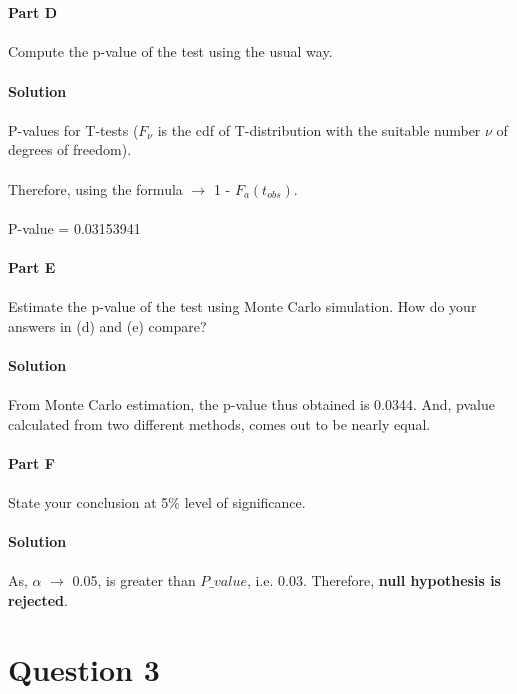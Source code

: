 \documentclass[12pt,a4paper]{report}
\begin{document}
\\\\
\textbf{Part D}
\\\\
Compute the p-value of the test using the usual way.
\\\\
\textbf{Solution}
\\\\
P-values for T-tests ($F_\nu$ is the cdf of T-distribution with the suitable number $\nu$ of degrees of freedom).\\\\
Therefore, using the formula $\rightarrow$ 1 - $F_{a} (t_{obs})$.\\\\
P-value = 0.03153941
\\\\
\textbf{Part E}
\\\\
Estimate the p-value of the test using Monte Carlo simulation. How do your answers in (d) and (e) compare?
\\\\
\textbf{Solution}
\\\\
From Monte Carlo estimation, the p-value thus obtained is 0.0344. And, pvalue calculated from two different methods, comes out to be nearly equal.
\\\\
\textbf{Part F}
\\\\
State your conclusion at 5\% level of significance.
\\\\
\textbf{Solution}
\\\\
As, $\alpha$ $\rightarrow$ 0.05, is greater than $P\_ value$, i.e. 0.03. Therefore, \textbf{null hypothesis is rejected}.
\section{Question 3}
\end{document}
